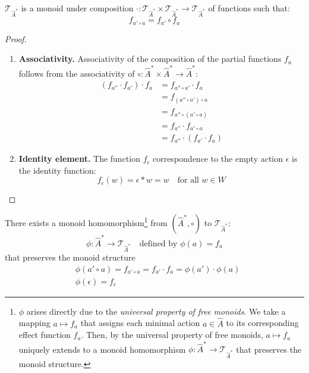 \begin{proposition}\label{prp:T_is_monoid}
    $\mathcal{T}_{\hat{A}^{\ast}}$ is a monoid under composition $\cdot: \mathcal{T}_{\hat{A}^{\ast}} \times \mathcal{T}_{\hat{A}^{\ast}} \to \mathcal{T}_{\hat{A}^{\ast}}$ of functions such that:
    \begin{equation}
        f_{a' \circ a} = f_{a'} \circ f_{a}
    \end{equation}
\end{proposition}
\begin{proof}
    \begin{enumerate}[(1)]
        \item \textbf{Associativity.}
        Associativity of the composition of the partial functions $f_{a}$ follows from the associativity of $\circ: \hat{A}^{\ast} \times \hat{A}^{\ast} \to \hat{A}^{\ast}$:
        \begin{align}
            (f_{a''} \cdot f_{a'}) \cdot f_{a}  &= f_{a'' \circ a'} \cdot f_{a} \\
                                                &= f_{(a'' \circ a') \circ a} \\
                                                &= f_{a'' \circ (a' \circ a)} \\
                                                &= f_{a''} \cdot f_{a' \circ a} \\
                                                &= f_{a''} \cdot (f_{a'} \cdot f_{a})
        \end{align}
        \item \textbf{Identity element.}
        The function $f_{\epsilon}$ correspondence to the empty action $\epsilon$ is the identity function:
        \begin{equation}
            f_{\epsilon}(w) = \epsilon \ast w = w \quad \text{for all $w \in W$}
        \end{equation}
    \end{enumerate}
\end{proof}

There exists a monoid homomorphism\footnote{
$\phi$ arises directly due to the \emph{universal property of free monoids}.
We take a mapping $a \mapsto f_{a}$ that assigns each minimal action $a \in \hat{A}$ to its corresponding effect function $f_{a}$.
Then, by the universal property of free monoids, $a \mapsto f_{a}$ uniquely extends to a monoid homomorphism $\phi : \hat{A}^{\ast} \to \mathcal{T}_{\hat{A}^{\ast}}$ that preserves the monoid structure.
} from $(\hat{A}^{\ast}, \circ)$ to $\mathcal{T}_{\hat{A}^{\ast}}$:
\begin{equation}
    \phi : \hat{A}^{\ast} \to \mathcal{T}_{\hat{A}^{\ast}} \quad\text{defined by $\phi(a) = f_{a}$}
\end{equation}
that preserves the monoid structure
\begin{align}
    &\phi(a' \circ a) = f_{a' \circ a} = f_{a'} \cdot f_{a} = \phi(a') \cdot \phi(a) \\
    &\phi(\epsilon) = f_{\epsilon}
\end{align}

